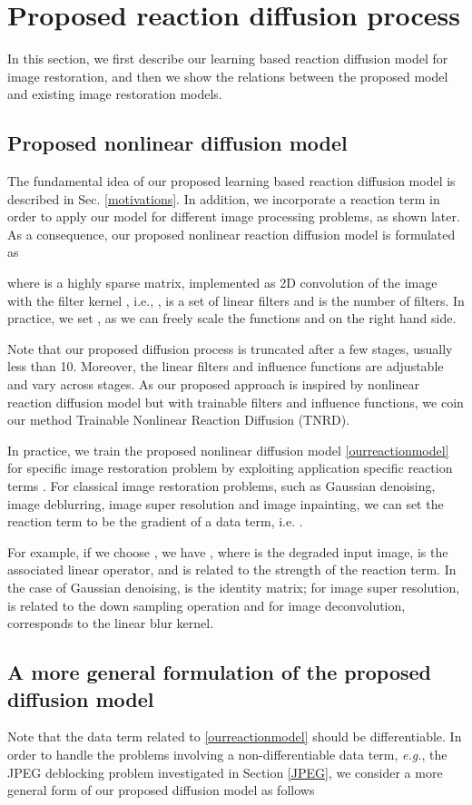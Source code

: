 \documentclass[10pt,journal,compsoc]{IEEEtran}
\newcommand{\eg}{\emph{e.g.}}
\begin{document}
\section{Proposed reaction diffusion process}
{In this section, we first describe our learning based reaction 
diffusion model for image restoration, and then 
we show the relations between the proposed model and existing image 
restoration models. 
\subsection{Proposed nonlinear diffusion model}
The fundamental idea of our proposed learning based reaction diffusion 
model is described in Sec. \ref{motivations}. In addition, 
we incorporate a reaction term in order to apply our model for 
different image processing problems, as shown later. 
As a consequence, our proposed nonlinear reaction diffusion model is formulated as

where  is a highly sparse matrix, implemented as 
2D convolution of the image  
with the filter kernel , i.e., , 
 is a set of linear filters and  is the number of filters. 
In practice, we set , as we can freely scale the functions 
 and  on the right hand side. 

Note that our proposed diffusion process is truncated after a few stages, usually 
less than 10. Moreover, the linear filters and influence functions 
are adjustable and vary across stages. As our proposed approach is inspired by nonlinear reaction diffusion model but with trainable filters and 
influence functions, we coin our method Trainable Nonlinear Reaction Diffusion (TNRD). 

In practice, 
we train the proposed nonlinear diffusion model \eqref{ourreactionmodel} 
for specific image restoration problem by exploiting 
application specific reaction terms . 
For classical image restoration problems, such as
Gaussian denoising, image deblurring, image super resolution and image
inpainting, we can set the reaction term to be the gradient of a data
term, i.e. . 

For example, if we choose , we have , where  is the degraded input image,  is the
associated linear operator, and  is related to the strength
of the reaction term. In the case of Gaussian denoising,  is the
identity matrix; for image super resolution,  is related to the down sampling operation and for image 
deconvolution,  corresponds to the linear blur kernel.

\subsection{A more general formulation of the proposed diffusion model}
Note that the data term  related to \eqref{ourreactionmodel} 
should be differentiable. In order to handle the problems involving a 
non-differentiable data term, \eg, the JPEG deblocking 
problem investigated in Section \ref{JPEG}, we consider a more general form 
of our proposed diffusion model as follows

}
\end{document}
